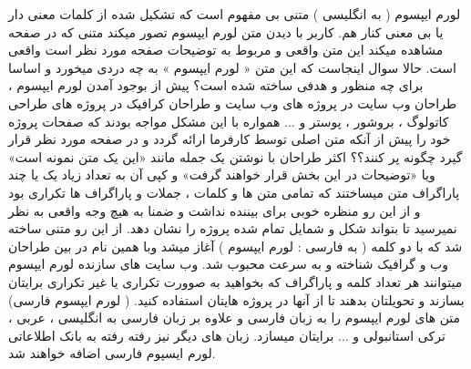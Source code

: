لورم ایپسوم ( به انگلیسی  ) متنی بی مفهوم است که تشکیل شده از کلمات معنی دار یا بی معنی کنار هم. کاربر با دیدن متن لورم ایپسوم تصور میکند متنی که در صفحه مشاهده میکند این متن واقعی و مربوط به توضیحات صفحه مورد نظر است واقعی است. حالا سوال اینجاست که این متن « لورم ایپسوم » به چه دردی میخورد و اساسا برای چه منظور و هدفی ساخته شده است؟ پیش از بوجود آمدن لورم ایپسوم ، طراحان وب سایت در پروژه های وب سایت و طراحان کرافیک در پروژه های طراحی کاتولوگ ، بروشور ، پوستر و ... همواره با این مشکل مواجه بودند که صفحات پروژه خود را پیش از آنکه متن اصلی توسط کارفرما ارائه گردد و در صفحه مورد نظر قرار گیرد چگونه پر کنند؟؟ اکثر طراحان با نوشتن یک جمله مانند «این یک متن نمونه است» ویا «توضیحات در این بخش قرار خواهند گرفت» و کپی آن به تعداد زیاد یک یا چند پاراگراف متن میساختند که تمامی متن ها و کلمات ، جملات و پاراگراف ها تکراری بود و از این رو منظره خوبی برای بیننده نداشت و ضمنا به هیچ وجه واقعی به نظر نمیرسید تا بتواند شکل و شمایل تمام شده پروژه را نشان دهد. از این رو متنی ساخته شد که با دو کلمه ( به فارسی : لورم ایپسوم ) آغاز میشد وبا همین نام در بین طراحان وب و گرافیک شناخته و به سرعت محبوب شد. وب سایت های سازنده لورم ایپسوم میتوانند هر تعداد کلمه و پاراگراف که بخواهید به صوورت تکراری یا غیر تکراری برایتان بسازند و تحویلتان بدهند تا از آنها در پروژه هایتان استفاده کنید. ( لورم ایپسوم فارسی) متن های لورم ایپسوم را به زبان فارسی و علاوه بر زبان فارسی به انگلیسی ، عربی ، ترکی استانبولی و ... برایتان میسازد. زبان های دیگر نیز رفته رفته به بانک اطلاعاتی لورم ایسپوم فارسی اضافه خواهند شد.  

